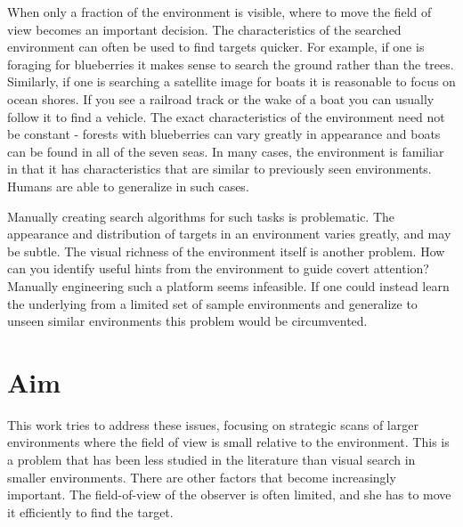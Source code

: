 When only a fraction of the environment is visible, where to move the field of view becomes an important decision.
The characteristics of the searched environment can often be used to find targets quicker.
For example, if one is foraging for blueberries it makes sense to search the ground rather than the trees.
Similarly, if one is searching a satellite image for boats it is reasonable to focus on ocean shores.
If you see a railroad track or the wake of a boat you can usually follow it to find a vehicle.
The exact characteristics of the environment need not be constant - forests with blueberries can vary greatly in appearance and boats can be found in all of the seven seas.
In many cases, the environment is familiar in that it has characteristics that are similar to previously seen environments.
Humans are able to generalize in such cases.

Manually creating search algorithms for such tasks is problematic.
The appearance and distribution of targets in an environment varies greatly, and may be subtle.
The visual richness of the environment itself is another problem.
How can you identify useful hints from the environment to guide covert attention?
Manually engineering such a platform seems infeasible.
If one could instead learn the underlying from a limited set of sample environments and generalize to unseen similar environments this problem would be circumvented.



\section{Aim}
\label{sec:aim}


This work tries to address these issues, focusing on strategic scans of larger environments where the field of view is small relative to the environment.
This is a problem that has been less studied in the literature than visual search in smaller environments.
There are other factors that become increasingly important. The field-of-view of the observer is often limited, and she has to move it efficiently to find the target.

